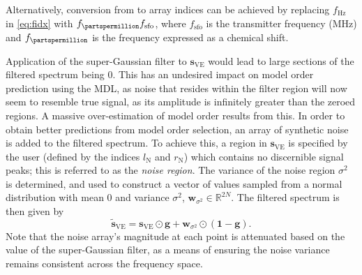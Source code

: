 Alternatively, conversion from \unit{\partspermillion} to array indices can be
achieved by replacing  $f_{\unit{\hertz}}$ in \cref{eq:fidx} with
$f_{\unit{\partspermillion}} f_{\text{sfo}}$, where $f_{\text{sfo}}$ is the
transmitter frequency (\unit{\mega \hertz}) and $f_{\unit{\partspermillion}}$
is the frequency expressed as a chemical shift.

Application of the
super-Gaussian filter to $\symbf{s}_{\text{VE}}$
would lead to large sections of the filtered spectrum being $0$. This has an
undesired impact on model order prediction using the \ac{MDL}, as noise that
resides within the filter region will now seem to resemble true signal,
as its amplitude is infinitely greater than the zeroed regions. A massive
over-estimation of model order results from this.
In order to obtain better predictions from model order selection, an array of
synthetic noise is
added to the filtered spectrum. To achieve this, a region in
$\symbf{s}_{\text{VE}}$ is specified by the user (defined by the indices
$l_{\text{N}}$ and  $r_{\text{N}}$) which contains no discernible
signal peaks; this is referred to as the \emph{noise region}. The variance of
the noise region $\sigma^2$ is determined, and used to construct a vector of
values sampled from a normal distribution with mean $0$ and variance
$\sigma^2$, $\symbf{w}_{\sigma^2} \in \mathbb{R}^{2N}$.
The filtered spectrum is then given by
\begin{equation}
    \widetilde{\symbf{s}}_{\text{VE}} = \symbf{s}_{\text{VE}} \odot \symbf{g} + \symbf{w}_{\sigma^2} \odot \left(\symbf{1} - \symbf{g} \right).
    \label{eq:Sve-tilde}
\end{equation}
Note that the noise array's magnitude at each point is attenuated based on the
value of the super-Gaussian filter, as a means of ensuring the noise variance
remains consistent across the frequency space.

